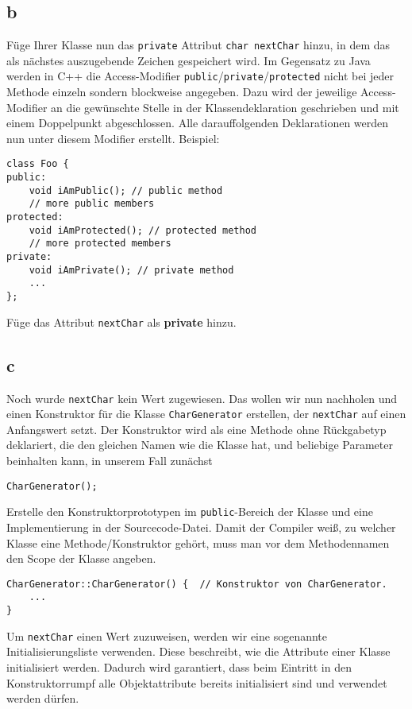 \subsection{b}
Füge Ihrer Klasse nun das \texttt{private} Attribut \texttt{char nextChar} hinzu, in dem das als nächstes auszugebende Zeichen gespeichert wird. Im Gegensatz zu Java  werden in C++ die Access-Modifier \texttt{public}/\texttt{private}/\texttt{protected} nicht bei jeder Methode einzeln sondern blockweise angegeben. Dazu wird der jeweilige Access-Modifier an die gewünschte Stelle in der Klassendeklaration geschrieben und mit einem Doppelpunkt abgeschlossen.  Alle darauffolgenden Deklarationen werden nun unter diesem Modifier erstellt. Beispiel:

\begin{lstlisting}
class Foo {
public:
	void iAmPublic(); // public method
	// more public members
protected:
	void iAmProtected(); // protected method
	// more protected members
private:
	void iAmPrivate(); // private method
	...
};
\end{lstlisting}

Füge das Attribut \texttt{nextChar} als \textbf{private} hinzu.

\subsection{c}
Noch wurde \texttt{nextChar} kein Wert zugewiesen.
Das wollen wir nun nachholen und einen Konstruktor für die Klasse \texttt{CharGenerator} erstellen, der \texttt{nextChar} auf einen Anfangswert setzt.
Der Konstruktor wird als eine Methode ohne Rückgabetyp deklariert, die den gleichen Namen wie die Klasse hat, und beliebige Parameter beinhalten kann, in unserem Fall zunächst
\begin{lstlisting}
CharGenerator();
\end{lstlisting}

Erstelle den Konstruktorprototypen im \texttt{public}-Bereich der Klasse und eine Implementierung in der Sourcecode-Datei. Damit der Compiler weiß, zu welcher Klasse eine Methode/Konstruktor gehört, muss man vor dem Methodennamen den Scope der Klasse angeben.

\begin{lstlisting}
CharGenerator::CharGenerator() {  // Konstruktor von CharGenerator.
	...
}
\end{lstlisting}

Um \texttt{nextChar} einen Wert zuzuweisen, werden wir eine sogenannte Initialisierungsliste verwenden.
Diese beschreibt, wie die Attribute einer Klasse initialisiert werden.
Dadurch wird garantiert, dass beim Eintritt in den Konstruktorrumpf alle Objektattribute bereits initialisiert sind und verwendet werden dürfen.

